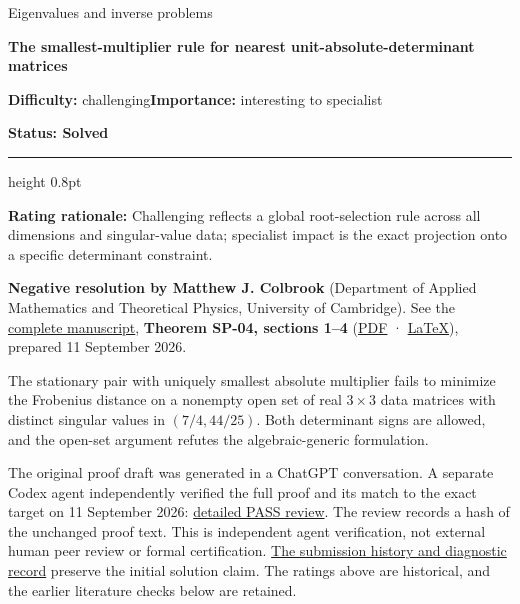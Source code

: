 \documentclass[11pt,a4paper]{article}
\makeatletter
\renewcommand{\subsection}{\Needspace{4\baselineskip}\@startsection{subsection}{2}{0pt}{9pt plus 1pt minus 1pt}{3pt}{\sffamily\bfseries\normalsize\color{ink}}}
\makeatother
\begin{document}
{\sffamily\small\color{muted}Eigenvalues and inverse problems\par}
\vspace{3pt}
{\raggedright{}\sffamily\bfseries\fontsize{21}{24}\selectfont\color{ink}The
smallest-multiplier rule for nearest unit-absolute-determinant
matrices\par}
\vspace{7pt}
{\sffamily\small\textbf{Difficulty:} challenging\quad\textbf{Importance:} interesting
to specialist\par}
{\sffamily\small\bfseries\color{accent}Status: Solved\par}
\vspace{4pt}
{\color{accent}\hrule height 0.8pt}
\vspace{6pt}
\textbf{Rating rationale:} Challenging reflects a global root-selection
rule across all dimensions and singular-value data; specialist impact is
the exact projection onto a specific determinant constraint.

\subsection{Resolution --- 2026-09-11}\label{resolution-2026-09-11}

\textbf{Negative resolution by Matthew J. Colbrook} (Department of
Applied Mathematics and Theoretical Physics, University of Cambridge).
See the
\href{https://github.com/ajt60gaibb/OpenProblemsInNLA/blob/main/eigenvalues-and-inverse-problems/SP-04/solution.md}{complete
manuscript}, \textbf{Theorem SP-04, sections 1--4}
(\href{https://github.com/ajt60gaibb/OpenProblemsInNLA/blob/main/eigenvalues-and-inverse-problems/SP-04/solution.pdf}{PDF}
·
\href{https://github.com/ajt60gaibb/OpenProblemsInNLA/blob/main/eigenvalues-and-inverse-problems/SP-04/solution.tex}{LaTeX}),
prepared 11 September 2026.

The stationary pair with uniquely smallest absolute multiplier fails to
minimize the Frobenius distance on a nonempty open set of real
\(3\times3\) data matrices with distinct singular values in
\((7/4,44/25)\). Both determinant signs are allowed, and the open-set
argument refutes the algebraic-generic formulation.

The original proof draft was generated in a ChatGPT conversation. A
separate Codex agent independently verified the full proof and its match
to the exact target on 11 September 2026:
\href{https://github.com/ajt60gaibb/OpenProblemsInNLA/blob/main/references/colbrook-2026-09-11/verification/reviews/SP-04-review.md}{detailed
PASS review}. The review records a hash of the unchanged proof text.
This is independent agent verification, not external human peer review
or formal certification.
\href{https://github.com/ajt60gaibb/OpenProblemsInNLA/blob/main/references/colbrook-2026-09-11/README.md}{The
submission history and diagnostic record} preserve the initial solution
claim. The ratings above are historical, and the earlier literature
checks below are retained.
\end{document}
